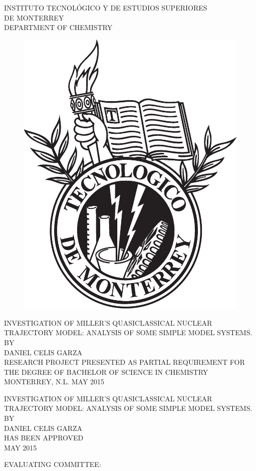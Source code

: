 \documentclass[12pt]{report}      %
\begin{document}
\setcounter{page}{1}
\thispagestyle{empty}
\begin{center}
	\noindent INSTITUTO TECNOLÓGICO Y DE ESTUDIOS SUPERIORES\\
	\noindent DE MONTERREY\\[0.75cm]
	\noindent DEPARTMENT OF CHEMISTRY\\[0.8in]
\end{center}
\begin{figure}[h]
	\centering
	\includegraphics[height=5.5 cm]{tec.eps}
	\vspace{0cm}
\end{figure}
\vspace{1cm}
\begin{center}
	\noindent INVESTIGATION OF MILLER'S QUASICLASSICAL NUCLEAR TRAJECTORY MODEL: ANALYSIS OF SOME SIMPLE MODEL SYSTEMS.\\
	\noindent BY\\
	\noindent DANIEL CELIS GARZA\\[1cm]
	\small RESEARCH PROJECT PRESENTED AS PARTIAL REQUIREMENT FOR THE DEGREE OF BACHELOR OF SCIENCE IN CHEMISTRY\\
	\vfill
	\noindent MONTERREY, N.L. \hfill MAY 2015\\
\end{center}
\newpage
\thispagestyle{empty}
\begin{center}
	\noindent INVESTIGATION OF MILLER'S QUASICLASSICAL NUCLEAR TRAJECTORY MODEL: ANALYSIS OF SOME SIMPLE MODEL SYSTEMS.\\[2cm]
	\noindent BY\\
	\noindent DANIEL CELIS GARZA\\[0.3cm]
	\noindent \small HAS BEEN APPROVED\\
	\noindent \small MAY 2015\\[0.3cm]
\end{center}
\begin{flushleft}
	\noindent EVALUATING COMMITTEE:\\[0.3cm]
\end{flushleft}
\end{document}
